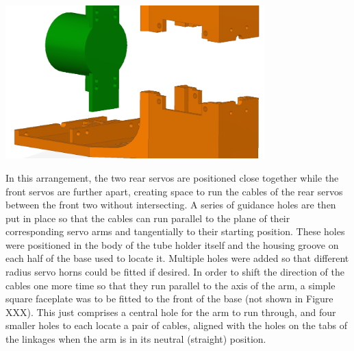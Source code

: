 \documentclass[11pt]{article}
\begin{document}
\begin{center}
\includegraphics[width=0.75\textwidth]{images/halvesConcept.png}
\label{figure:halvesConcept}
\end{center}

In this arrangement, the two rear servos are positioned close together while the front servos are further apart, creating space to run the cables of the rear servos between the front two without intersecting. A series of guidance holes are then put in place so that the cables can run parallel to the plane of their corresponding servo arms and tangentially to their starting position. These holes were positioned in the body of the tube holder itself and the housing groove on each half of the base used to locate it. Multiple holes were added so that different radius servo horns could be fitted if desired. In order to shift the direction of the cables one more time so that they run parallel to the axis of the arm, a simple square faceplate was to be fitted to the front of the base (not shown in Figure XXX). This just comprises a central hole for the arm to run through, and four smaller holes to each locate a pair of cables, aligned with the holes on the tabs of the linkages when the arm is in its neutral (straight) position.
\end{document}
